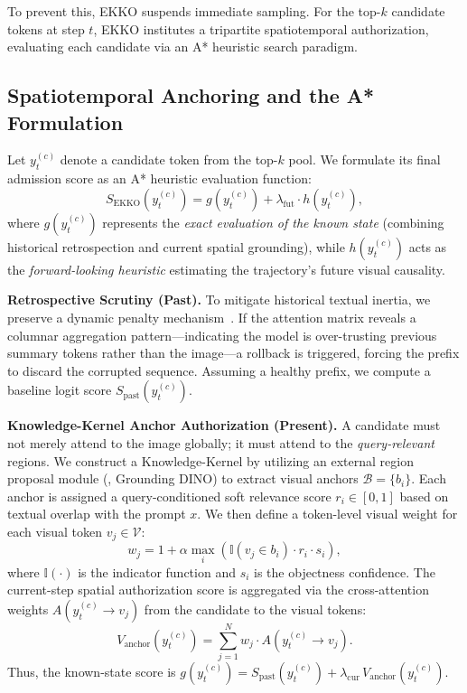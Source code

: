 To prevent this, EKKO suspends immediate sampling. For the top-$k$ candidate tokens at step $t$, EKKO institutes a tripartite spatiotemporal authorization, evaluating each candidate via an A* heuristic search paradigm.

\subsection{Spatiotemporal Anchoring and the A* Formulation}
\label{sec:astar}

Let $y_t^{(c)}$ denote a candidate token from the top-$k$ pool. We formulate its final admission score as an A* heuristic evaluation function:
\begin{equation}
    S_{\text{EKKO}}(y_t^{(c)}) = g(y_t^{(c)}) + \lambda_{\mathrm{fut}} \cdot h(y_t^{(c)}),
\end{equation}
where $g(y_t^{(c)})$ represents the \textit{exact evaluation of the known state} (combining historical retrospection and current spatial grounding), while $h(y_t^{(c)})$ acts as the \textit{forward-looking heuristic} estimating the trajectory's future visual causality.

\noindent\textbf{Retrospective Scrutiny (Past).} To mitigate historical textual inertia, we preserve a dynamic penalty mechanism~\cite{huang2024opera_cvpr}. If the attention matrix reveals a columnar aggregation pattern---indicating the model is over-trusting previous summary tokens rather than the image---a rollback is triggered, forcing the prefix to discard the corrupted sequence. Assuming a healthy prefix, we compute a baseline logit score $S_{\mathrm{past}}(y_t^{(c)})$.

\noindent\textbf{Knowledge-Kernel Anchor Authorization (Present).} A candidate must not merely attend to the image globally; it must attend to the \textit{query-relevant} regions. We construct a Knowledge-Kernel by utilizing an external region proposal module (\eg, Grounding DINO) to extract visual anchors $\mathcal{B} = \{b_i\}$. Each anchor is assigned a query-conditioned soft relevance score $r_i \in [0, 1]$ based on textual overlap with the prompt $x$. We then define a token-level visual weight for each visual token $v_j \in \mathcal{V}$:
\begin{equation}
    w_j = 1 + \alpha \max_i \!\left(\mathbb{I}(v_j \in b_i) \cdot r_i \cdot s_i\right),
\end{equation}
where $\mathbb{I}(\cdot)$ is the indicator function and $s_i$ is the objectness confidence. The current-step spatial authorization score is aggregated via the cross-attention weights $A(y_t^{(c)} \to v_j)$ from the candidate to the visual tokens:
\begin{equation}
    V_{\mathrm{anchor}}(y_t^{(c)}) = \sum_{j=1}^{N} w_j \cdot A(y_t^{(c)} \to v_j).
\end{equation}
Thus, the known-state score is $g(y_t^{(c)}) = S_{\mathrm{past}}(y_t^{(c)}) + \lambda_{\mathrm{cur}}\, V_{\mathrm{anchor}}(y_t^{(c)})$.


